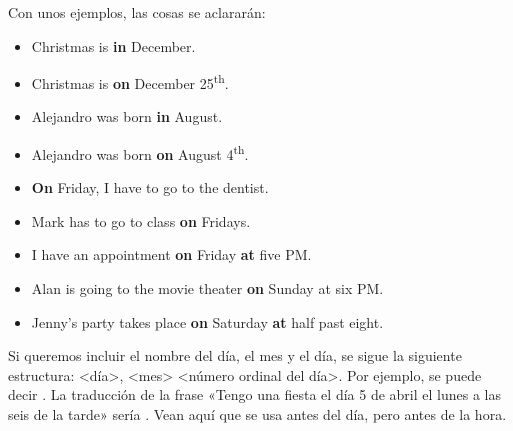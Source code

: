 Con unos ejemplos, las cosas se aclarar\'an:
\begin{itemize}
	\item {}
		\arr Christmas is \textbf{in} December.
	\item {}
		\arr Christmas is \textbf{on} December 25\textsuperscript{th}.
	\item {}
		\arr Alejandro was born \textbf{in} August.
	\item {}
		\arr Alejandro was born \textbf{on} August 4\textsuperscript{th}.
	\item {}
		\arr \textbf{On} Friday, I have to go to the dentist.
	\item {}
		\arr Mark has to go to class \textbf{on} Fridays.
	\item {}
		\arr I have an appointment \textbf{on} Friday \textbf{at} five PM.
	\item {}
		\arr Alan is going to the movie theater \textbf{on} Sunday at six PM.
	\item {}
		\arr Jenny's party takes place \textbf{on} Saturday \textbf{at} half past eight.
\end{itemize}


Si queremos incluir el nombre del d\'ia, el mes y el d\'ia, se sigue la siguiente estructura:
<día>, <mes> <número ordinal del d\'ia>.
Por ejemplo, se puede decir .
La traducci\'on de la frase «Tengo una fiesta el d\'ia 5 de abril el lunes a las seis de la tarde» ser\'ia
.
Vean aqu\'i que se usa  antes del d\'ia, pero  antes de la hora. \\

